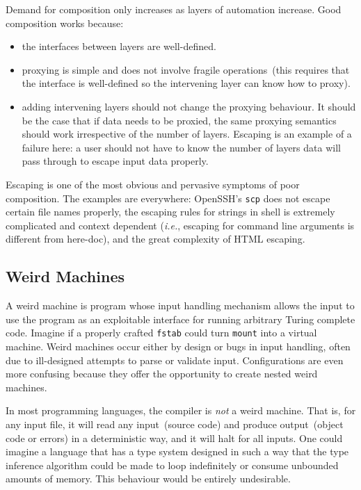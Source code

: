 \documentclass[letterpaper,twocolumn,10pt]{article}
\begin{document}
Demand for composition only increases as layers of automation increase. Good composition works because:

\begin{itemize}
\item the interfaces between layers are well-defined.
\item proxying is simple and does not involve fragile operations~(this requires that the interface is well-defined so the intervening layer can know how to proxy).
\item adding intervening layers should not change the proxying behaviour. It should be the case that if data needs to be proxied, the same proxying semantics should work irrespective of the number of layers. Escaping is an example of a failure here: a user should not have to know the number of layers data will pass through to escape input data properly.
\end{itemize}

Escaping is one of the most obvious and pervasive symptoms of poor composition. The examples are everywhere: OpenSSH's \texttt{scp} does not escape certain file names properly, the escaping rules for strings in shell is extremely complicated and context dependent (\emph{i.e.}, escaping for command line arguments is different from here-doc), and the great complexity of HTML escaping.

\subsection{Weird Machines}
A weird machine is program whose input handling mechanism allows the input to use the program as an exploitable interface for running arbitrary Turing complete code. Imagine if a properly crafted \texttt{fstab} could turn \texttt{mount} into a virtual machine. Weird machines occur either by design or bugs in input handling, often due to ill-designed attempts to parse or validate input. Configurations are even more confusing because they offer the opportunity to create nested weird machines.

In most programming languages, the compiler is \emph{not} a weird machine. That is, for any input file, it will read any input~(source code) and produce output~(object code or errors) in a deterministic way, and it will halt for all inputs. One could imagine a language that has a type system designed in such a way that the type inference algorithm could be made to loop indefinitely or consume unbounded amounts of memory. This behaviour would be entirely undesirable.
\end{document}
